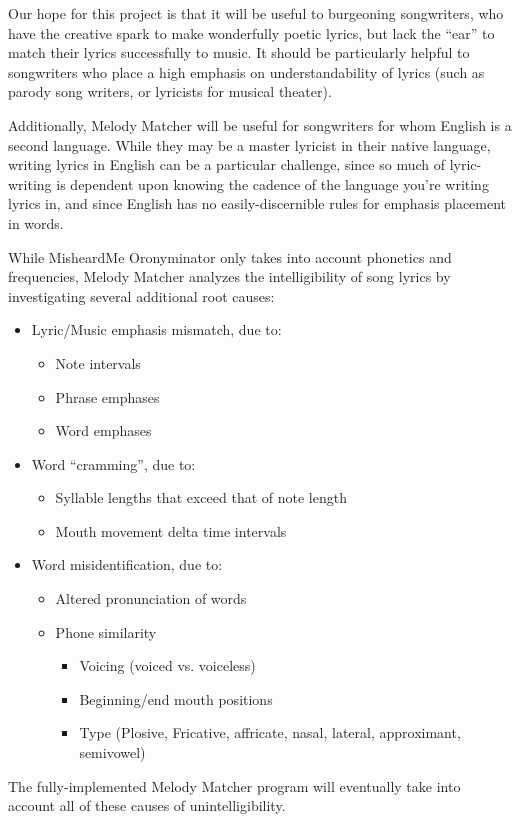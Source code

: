 Our hope for this project is that it will be useful to burgeoning songwriters, who have the creative spark to make wonderfully poetic lyrics, but lack the ``ear'' to match their lyrics successfully to music. It should be particularly helpful to songwriters who place a high emphasis on understandability of lyrics (such as parody song writers, or lyricists for musical theater).

Additionally, Melody Matcher will be useful for songwriters for whom English is a second language. While they may be a master lyricist in their native language, writing lyrics in English can be a particular challenge, since so much of lyric-writing is dependent upon knowing the cadence of the language you're writing lyrics in, and since English has no easily-discernible rules for emphasis placement in words.



While MisheardMe Oronyminator only takes into account phonetics and frequencies, Melody Matcher analyzes the intelligibility of song lyrics by investigating several additional root causes:


\begin{itemize} 
\item Lyric/Music emphasis mismatch, due to: 

    \begin{itemize} 
    \item Note intervals
    \item Phrase emphases
    \item Word emphases
    \end{itemize} 

\item Word ``cramming'', due to:

    \begin{itemize} 
    \item Syllable lengths that exceed that of note length
    \item Mouth movement delta time intervals
    \end{itemize} 

\item Word misidentification, due to:

    \begin{itemize} 
    \item Altered pronunciation of words
    \item Phone similarity

        \begin{itemize} 
        \item Voicing (voiced vs. voiceless)
        \item Beginning/end mouth positions
        \item Type (Plosive, Fricative, affricate, nasal, lateral, approximant, semivowel)
        \end{itemize} 
    
    \end{itemize} 
    \end{itemize} 

The fully-implemented Melody Matcher program will eventually take into account all of these causes of unintelligibility. 

